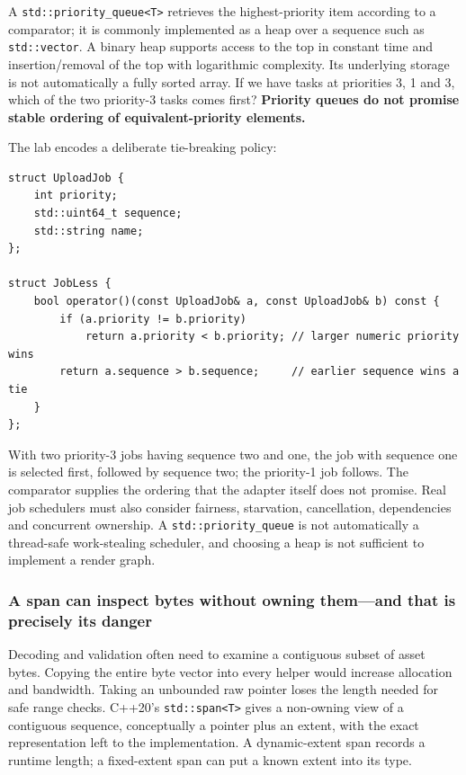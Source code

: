 A \texttt{std::priority\_queue\textless{}T\textgreater{}} retrieves the highest-priority item according to a comparator; it is commonly implemented as a heap over a sequence such as \texttt{std::vector}. A binary heap supports access to the top in constant time and insertion/removal of the top with logarithmic complexity. Its underlying storage is not automatically a fully sorted array. If we have tasks at priorities 3, 1 and 3, which of the two priority-3 tasks comes first? \textbf{Priority queues do not promise stable ordering of equivalent-priority elements.}

The lab encodes a deliberate tie-breaking policy:

\begin{verbatim}
struct UploadJob {
    int priority;
    std::uint64_t sequence;
    std::string name;
};

struct JobLess {
    bool operator()(const UploadJob& a, const UploadJob& b) const {
        if (a.priority != b.priority)
            return a.priority < b.priority; // larger numeric priority wins
        return a.sequence > b.sequence;     // earlier sequence wins a tie
    }
};
\end{verbatim}

With two priority-3 jobs having sequence two and one, the job with sequence one is selected first, followed by sequence two; the priority-1 job follows. The comparator supplies the ordering that the adapter itself does not promise. Real job schedulers must also consider fairness, starvation, cancellation, dependencies and concurrent ownership. A \texttt{std::priority\_queue} is not automatically a thread-safe work-stealing scheduler, and choosing a heap is not sufficient to implement a render graph.

\subsubsection{A span can inspect bytes without owning them---and that is precisely its danger}\label{a-span-can-inspect-bytes-without-owning-themand-that-is-precisely-its-danger}

Decoding and validation often need to examine a contiguous subset of asset bytes. Copying the entire byte vector into every helper would increase allocation and bandwidth. Taking an unbounded raw pointer loses the length needed for safe range checks. C++20's \texttt{std::span\textless{}T\textgreater{}} gives a non-owning view of a contiguous sequence, conceptually a pointer plus an extent, with the exact representation left to the implementation. A dynamic-extent span records a runtime length; a fixed-extent span can put a known extent into its type.

